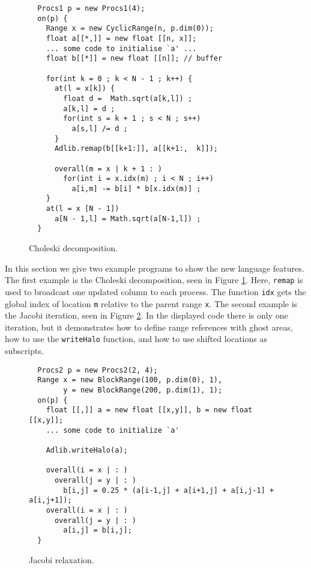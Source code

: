 \begin{figure}[tbp]
  \begin{center}
\begin{small}
\begin{verbatim}
  Procs1 p = new Procs1(4);
  on(p) {
    Range x = new CyclicRange(n, p.dim(0));
    float a[[*,]] = new float [[n, x]];
    ... some code to initialise `a' ...
    float b[[*]] = new float [[n]]; // buffer

    for(int k = 0 ; k < N - 1 ; k++) {
      at(l = x[k]) {
        float d =  Math.sqrt(a[k,l]) ;
        a[k,l] = d ;
        for(int s = k + 1 ; s < N ; s++)
          a[s,l] /= d ;
      }
      Adlib.remap(b[[k+1:]], a[[k+1:,  k]]);

      overall(m = x | k + 1 : )
        for(int i = x.idx(m) ; i < N ; i++)
          a[i,m] -= b[i] * b[x.idx(m)] ;
    }
    at(l = x [N - 1])
      a[N - 1,l] = Math.sqrt(a[N-1,l]) ;
  }
\end{verbatim}
\end{small}
    \caption{Choleski decomposition.}
    \label{fig:choleski}
  \end{center}
\end{figure}

In this section we give two example programs to show the new
language features.  The first example is the Choleski decomposition, seen in
Figure \ref{fig:choleski}.
Here, \texttt{remap} is used to broadcast one updated column to each
process. The function \texttt{idx} gets the global index of location
\texttt{m} relative to the parent range \texttt{x}.
The second example is the Jacobi iteration, seen in Figure \ref{fig:Jacobi}.
In the displayed code there is only one iteration, but it demonstrates
how to define range references with ghost areas, how to use
the \texttt{writeHalo} function, and how to use shifted locations
as subscripts. 


\begin{figure}[tbp]
  \begin{center}
\begin{small}
\begin{verbatim}
  Procs2 p = new Procs2(2, 4);
  Range x = new BlockRange(100, p.dim(0), 1),
        y = new BlockRange(200, p.dim(1), 1); 
  on(p) {
    float [[,]] a = new float [[x,y]], b = new float [[x,y]];
    ... some code to initialize `a'

    Adlib.writeHalo(a);

    overall(i = x | : )
      overall(j = y | : )
        b[i,j] = 0.25 * (a[i-1,j] + a[i+1,j] + a[i,j-1] + a[i,j+1]);
    overall(i = x | : )
      overall(j = y | : )
        a[i,j] = b[i,j];
  }
\end{verbatim}
\end{small}
    \caption{Jacobi relaxation.}
    \label{fig:Jacobi}
  \end{center}
\end{figure}


